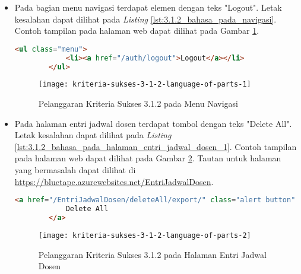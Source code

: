\begin{itemize}
    \item Pada bagian menu navigasi terdapat elemen dengan teks "Logout". Letak kesalahan dapat dilihat pada \textit{Listing} \ref{lst:3.1.2_bahasa_pada_navigasi}. Contoh tampilan pada halaman web dapat dilihat pada Gambar \ref{fig:3.1.2_language_of_parts_1}. 
    \begin{lstlisting}[frame=single, label={lst:3.1.2_bahasa_pada_navigasi}, language=HTML, caption=Pelanggaran Kriteria Sukses 3.1.2 pada Menu Navigasi]
        <ul class="menu">
            <li><a href="/auth/logout">Logout</a></li>
        </ul>
    \end{lstlisting}
    
    \begin{figure}[H]
        \centering  
        \texttt{[image: kriteria-sukses-3-1-2-language-of-parts-1]}  
        \caption[Pelanggaran Kriteria Sukses 3.1.2 pada Menu Navigasi]{Pelanggaran Kriteria Sukses 3.1.2 pada Menu Navigasi}
        \label{fig:3.1.2_language_of_parts_1}  
    \end{figure}

    \item Pada halaman entri jadwal dosen terdapat tombol dengan teks "Delete All". Letak kesalahan dapat dilihat pada \textit{Listing} \ref{lst:3.1.2_bahasa_pada_halaman_entri_jadwal_dosen_1}. Contoh tampilan pada halaman web dapat dilihat pada Gambar \ref{fig:3.1.2_language_of_parts_2}. Tautan untuk halaman yang bermasalah dapat dilihat di \url{https://bluetape.azurewebsites.net/EntriJadwalDosen}.
    \begin{lstlisting}[frame=single, label={lst:3.1.2_bahasa_pada_halaman_entri_jadwal_dosen_1}, language=HTML, caption=Pelanggaran Kriteria Sukses 3.1.2 pada Halaman Entri Jadwal Dosen]
        <a href="/EntriJadwalDosen/deleteAll/export/" class="alert button" onClick="return konfirmasi();">
            Delete All
        </a>
    \end{lstlisting}
    
    \begin{figure}[H]
        \centering  
        \texttt{[image: kriteria-sukses-3-1-2-language-of-parts-2]}  
        \caption[Pelanggaran Kriteria Sukses 3.1.2 pada Halaman Entri Jadwal Dosen]{Pelanggaran Kriteria Sukses 3.1.2 pada Halaman Entri Jadwal Dosen}
        \label{fig:3.1.2_language_of_parts_2}  
    \end{figure}
    

\end{itemize}

